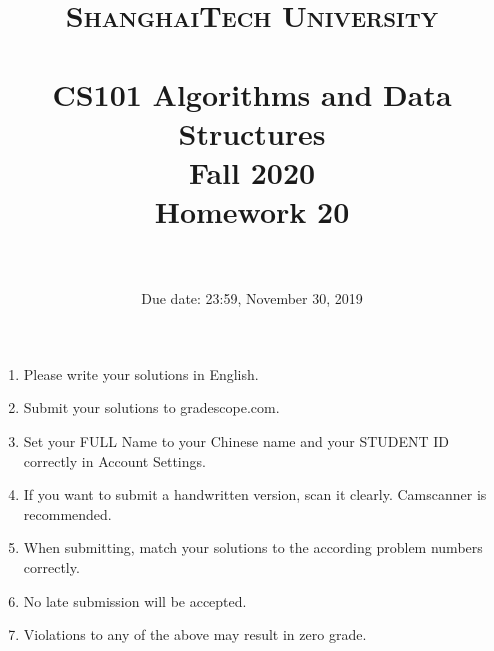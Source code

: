 \documentclass[10.5pt]{article}
\title{
        \normalfont \normalsize
        \textsc{ShanghaiTech University} \\ [25pt]
        \horrule{0.5pt} \\[0.4cm] %
        \huge CS101 Algorithms and Data Structures\\ %
        \LARGE Fall 2020\\
        \LARGE Homework 20\\
        \horrule{2pt} \\[0.5cm] %
    }
\author{}
\date{Due date: 23:59, November 30, 2019}
\begin{document}
    
    \maketitle
    \thispagestyle{firstpage}
    \vspace{3ex}
    
    \begin{enumerate}
    \item Please write your solutions in English. 
    
    \item Submit your solutions to gradescope.com.  
    
    \item Set your FULL Name to your Chinese name and your STUDENT ID correctly in Account Settings. 
    
    \item If you want to submit a handwritten version, scan it clearly. Camscanner is recommended. 
    
    \item When submitting, match your solutions to the according problem numbers correctly. 
    
    \item No late submission will be accepted.
    
    \item Violations to any of the above may result in zero grade. 
    \end{enumerate}
    \newpage
    
\end{document}
